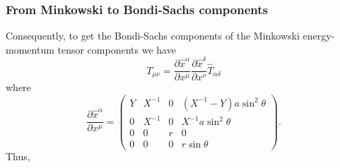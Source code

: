 \documentclass[twocolumn,superscriptaddress]{revtex4}
\begin{document}
\subsubsection{From Minkowski to Bondi-Sachs components}
Consequently, to get the Bondi-Sachs components of the Minkowski energy-momentum tensor components we have
\begin{equation}
T_{\mu\nu}=\frac{\partial\hat x^\alpha}{\partial x^\mu}\frac{\partial\hat x^\delta}{\partial x^\nu} \hat T_{\alpha\delta}
\end{equation}
where
\begin{equation}
\frac{\partial\hat x^\alpha}{\partial x^\mu}=
\left(
\begin{array}{cccc}
 Y & X^{-1}  & 0  &(X^{-1}-Y)a\sin^2\theta\\
 0 & X^{-1} & 0 & X^{-1}a\sin^2\theta\\
 0 & 0  & r & 0 \\
 0 &0& 0 &r \sin\theta
\end{array}
\right).
\end{equation}
Thus,
\end{document}
